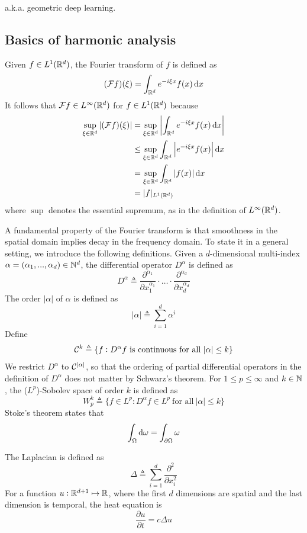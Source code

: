 \documentclass{article}
\newcommand{\pp}[2]{{\frac{\partial {#1}}{\partial {#2}}}}
\begin{document}
a.k.a. geometric deep learning.

\subsection{Basics of harmonic analysis}

Given $f \in L^1 ({\mathbb R}^d)$, the Fourier transform of $f$ is defined as
\[
(\calf f) (\xi) = \int_{\bbr^d} e^{-i \xi x} f(x) \dif x
\]
It follows that ${\mathcal F} f \in L^\infty ({\mathbb R}^d)$ for $f \in L^1 ({\mathbb R}^d)$ because
\begin{align*}
\sup_{\xi \in \bbr^d} |(\calf f) (\xi)|
& = \sup_{\xi \in \bbr^d} \left|\int_{\bbr^d} e^{-i \xi x} f(x) \dif x \right| \\
& \leq \sup_{\xi \in \bbr^d} \int_{\bbr^d} \left|e^{-i \xi x} f(x) \right| \dif x \\
& = \sup_{\xi \in \bbr^d} \int_{\bbr^d} |f(x)| \dif x \\
& = |f|_{L^1 (\bbr^d)}
\end{align*}
where $\sup$ denotes the essential supremum, as in the definition of $L^\infty ({\mathbb R}^d)$.

A fundamental property of the Fourier transform is that smoothness in the spatial domain implies decay in the frequency domain.
To state it in a general setting, we introduce the following definitions.
Given a $d$-dimensional multi-index $\alpha = (\alpha_1, ..., \alpha_d) \in {\mathbb N}^d$, the differential operator $D^\alpha$ is defined as
\[
D^\alpha \triangleq \frac{\partial^{\alpha_1}}{\partial x_1^{\alpha_1}} \cdot \ldots \cdot \frac{\partial^{\alpha_d}}{\partial x_d^{\alpha_d}}
\]
The order $|\alpha|$ of $\alpha$ is defined as
\[
|\alpha| \triangleq \sum_{i = 1}^d \alpha^i
\]
Define
\[
\calc^k \triangleq \{f : D^\alpha f\ \text{is continuous for all}\ |\alpha| \leq k\}
\]
We restrict $D^\alpha$ to ${\mathcal C}^{|\alpha|}$, so that the ordering of partial differential operators in the definition of $D^{\alpha}$ does not matter by Schwarz's theorem.
For $1 \leq p \leq \infty$ and $k \in {\mathbb N}$, the ($L^p$)-Sobolev space of order $k$ is defined as
\[
W_p^k \triangleq \{f \in L^p : D^\alpha f \in L^p\ \text{for all}\ |\alpha| \leq k\}
\]
Stoke's theorem states that
\[
\int_\Omega \dif \omega = \int_{\partial \Omega} \omega
\]

The Laplacian is defined as
\[
\Delta \triangleq \sum_{i = 1}^d \frac{\partial^2}{\partial x_i^2}
\]
For a function $u: {\mathbb R}^{d + 1} \mapsto {\mathbb R}$, where the first $d$ dimensions are spatial and the last dimension is temporal, the heat equation is
\[
\pp{u}{t} = c \Delta u
\]
\end{document}

